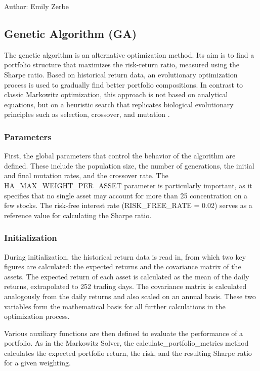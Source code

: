 \documentclass{agasthesis}
\begin{document}
Author: Emily Zerbe

\subsection{Genetic Algorithm (GA)}
The genetic algorithm is an alternative optimization method. Its aim is to find a portfolio structure that maximizes the risk-return ratio, measured using the Sharpe ratio. 
Based on historical return data, an evolutionary optimization process is used to gradually find better portfolio compositions. In contrast to classic Markowitz optimization, 
this approach is not based on analytical equations, but on a heuristic search that replicates biological evolutionary principles such as selection, crossover, and mutation \cite[p. 203]{soldatos_big_2022}.
\subsubsection{Parameters}
First, the global parameters that control the behavior of the algorithm are defined. These include the population size, the number of generations, the initial and final mutation rates, and the crossover rate. 
The HA_MAX_WEIGHT_PER_ASSET parameter is particularly important, as it specifies that no single asset may account for more than 25%
concentration on a few stocks. The risk-free interest rate (RISK_FREE_RATE = 0.02) serves as a reference value for calculating the Sharpe ratio.
\subsubsection{Initialization}
During initialization, the historical return data is read in, from which two key figures are calculated: the expected returns and the covariance matrix of the assets. 
The expected return of each asset is calculated as the mean of the daily returns, extrapolated to 252 trading days. The covariance matrix is calculated analogously from 
the daily returns and also scaled on an annual basis. These two variables form the mathematical basis for all further calculations in the optimization process.

Various auxiliary functions are then defined to evaluate the performance of a portfolio. As in the Markowitz Solver, the calculate_portfolio_metrics method calculates the 
expected portfolio return, the risk, and the resulting Sharpe ratio for a given weighting.
\end{document}
